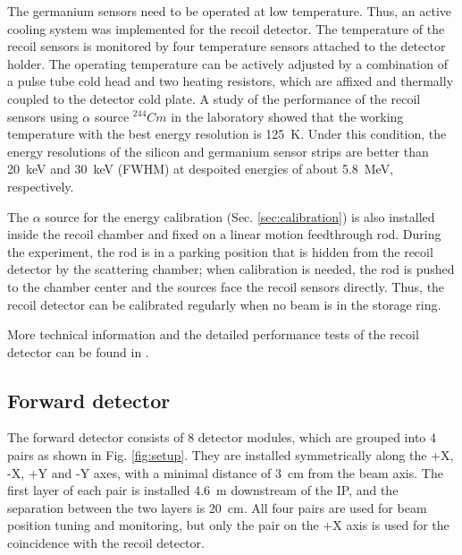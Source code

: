 \documentclass[number,5p]{elsarticle}
\begin{document}
The germanium sensors need to be operated at low temperature.
Thus, an active cooling system was implemented for the recoil detector.
The temperature of the recoil sensors is monitored by four temperature sensors attached to the detector holder.
The operating temperature can be actively adjusted by a combination of a pulse
tube cold head \cite{pt30} and two heating resistors, which are affixed and thermally coupled to the detector cold plate.
A study of the performance of the recoil sensors using $\alpha$ source
$^{244}Cm$ in the laboratory \cite{recoil_article} showed that the working temperature with the best energy resolution is
\SI{125}{\kelvin}.
Under this condition, the energy resolutions of the silicon and germanium
sensor strips are better than \SI{20}{\keV} and \SI{30}{\keV} (FWHM) at despoited
energies of about \SI{5.8}{\MeV}, respectively.

The $\alpha$ source for the energy calibration (Sec. \ref{sec:calibration}) is also installed inside the recoil chamber and fixed on a linear motion feedthrough rod.
During the experiment, the rod is in a parking position that is hidden from the
recoil detector by the scattering chamber;
when calibration is needed, the rod is pushed to the chamber center and the sources face the recoil sensors directly.
Thus, the recoil detector can be calibrated regularly when no beam is in the storage ring.

More technical information and the detailed performance tests of the recoil detector can be found in \cite{recoil_article}.

\subsection{Forward detector}
\label{sec:fwd}


The forward detector consists of 8 detector modules, which are
grouped into 4 pairs as shown in Fig. \ref{fig:setup}.
They are installed symmetrically along the +X, -X, +Y and -Y axes, with a minimal distance of \SI{3}{\cm} from the beam axis.
The first layer of each pair is installed \SI{4.6}{\meter} downstream of the IP, and the separation between the two layers is \SI{20}{\cm}.
All four pairs are used for beam position tuning and monitoring, but only the
pair on the +X axis is used for the coincidence with the recoil detector.
\end{document}
